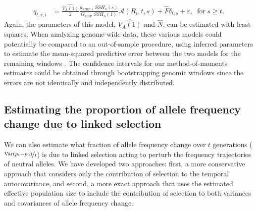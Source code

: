 \documentclass[11pt]{article}
\DeclareMathOperator{\var}{Var}
\begin{document}
\begin{align} 
  \label{eq:va-bp}
  q_{t,s,i} &= \frac{\widehat{V_A(1)}}{2} \frac{w_{\text{CBP},i} \; SSH_n(s)}{G_{\text{CBP}} \; SSH_n(1)} \mathcal{A} (R_i, t, s) + \widehat{F} \delta_{t,s} + \varepsilon, \;\; \text{for} \; s \ge t.
\end{align}
%
Again, the parameters of this model, $\widehat{V_A(1)}$ and $\widehat{N}$, can
be estimated with least squares. When analyzing genome-wide data, these various
models could potentially be compared to an out-of-sample procedure, using
inferred parameters to estimate the mean-squared predictive error between the
two models for the remaining windows \parencite{Elyashiv2016-vt}. The
confidence intervals for our method-of-moments estimates could be obtained
through bootstrapping genomic windows since the errors are not identically and
independently distributed.


\subsection{Estimating the proportion of allele frequency change due to linked selection}

We can also estimate what fraction of allele frequency change over $t$
generations ($\nicefrac{\var(p_t - p_0)}{t}$) is due to linked selection acting
to perturb the frequency trajectories of neutral alleles. We have developed two
approaches: first, a more conservative approach that considers only the
contribution of selection to the temporal autocovariance, and second, a more
exact approach that uses the estimated effective population size to include the
contribution of selection to both variances and covariances of allele frequency
change.
\end{document}
